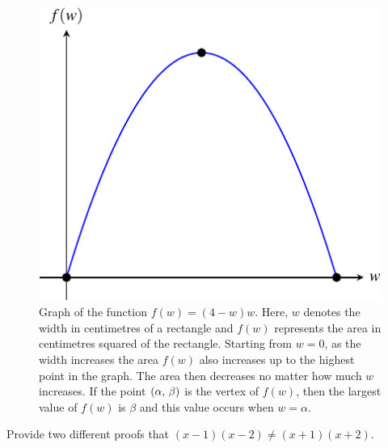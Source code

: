 \documentclass[a4paper,oneside,12pt]{article}
\begin{document}
\begin{problem}
{\begin{solution}
\begin{figure}[!htbp]
\centering
\includegraphics[scale=1]{image/08/rectangle-largest-area.pdf}
\caption{%
  Graph of the function $f(w) = (4 - w)w$.  Here, $w$ denotes the
  width in centimetres of a rectangle and $f(w)$ represents the area
  in centimetres squared of the rectangle.  Starting from $w = 0$, as
  the width increases the area $f(w)$ also increases up to the highest
  point in the graph.  The area then decreases no matter how much $w$
  increases.  If the point $\left\lparen{\alpha},\, {\beta}\right\rparen$ is the vertex of
  $f(w)$, then the largest value of $f(w)$ is $\beta$ and this value
  occurs when $w = \alpha$.
}
\label{fig:rectangle_largest_area}
\end{figure}
\end{solution}
}{}

\item Provide two different proofs that
  $(x - 1)(x - 2) \neq (x + 1)(x + 2)$.
\end{problem}
\end{document}
